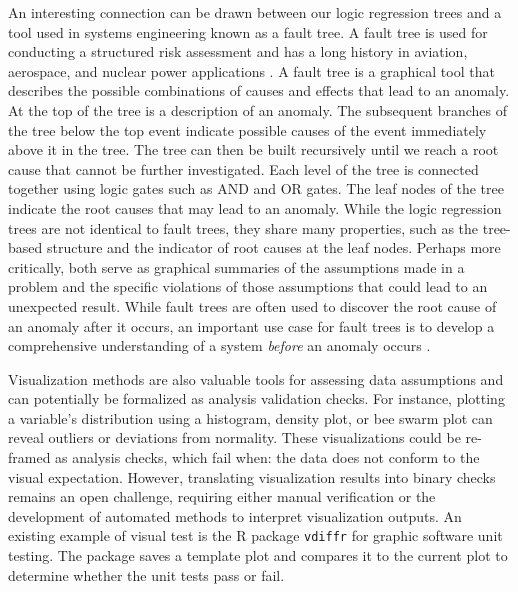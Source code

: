 \documentclass[
  12pt,
]{interact}
\begin{document}
An interesting connection can be drawn between our logic regression
trees and a tool used in systems engineering known as a fault tree. A
fault tree is used for conducting a structured risk assessment and has a
long history in aviation, aerospace, and nuclear power applications
\citep{vesely1981fault}. A fault tree is a graphical tool that describes
the possible combinations of causes and effects that lead to an anomaly.
At the top of the tree is a description of an anomaly. The subsequent
branches of the tree below the top event indicate possible causes of the
event immediately above it in the tree. The tree can then be built
recursively until we reach a root cause that cannot be further
investigated. Each level of the tree is connected together using logic
gates such as AND and OR gates. The leaf nodes of the tree indicate the
root causes that may lead to an anomaly. While the logic regression
trees are not identical to fault trees, they share many properties, such
as the tree-based structure and the indicator of root causes at the leaf
nodes. Perhaps more critically, both serve as graphical summaries of the
assumptions made in a problem and the specific violations of those
assumptions that could lead to an unexpected result. While fault trees
are often used to discover the root cause of an anomaly after it occurs,
an important use case for fault trees is to develop a comprehensive
understanding of a system \emph{before} an anomaly occurs
\citep{michael2002fault}.

Visualization methods are also valuable tools for assessing data
assumptions and can potentially be formalized as analysis validation
checks. For instance, plotting a variable's distribution using a
histogram, density plot, or bee swarm plot can reveal outliers or
deviations from normality. These visualizations could be re-framed as
analysis checks, which fail when: the data does not conform to the
visual expectation. However, translating visualization results into
binary checks remains an open challenge, requiring either manual
verification or the development of automated methods to interpret
visualization outputs. An existing example of visual test is the R
package \texttt{vdiffr} \citep{vdiffr} for graphic software unit
testing. The package saves a template plot and compares it to the
current plot to determine whether the unit tests pass or fail.
\end{document}
